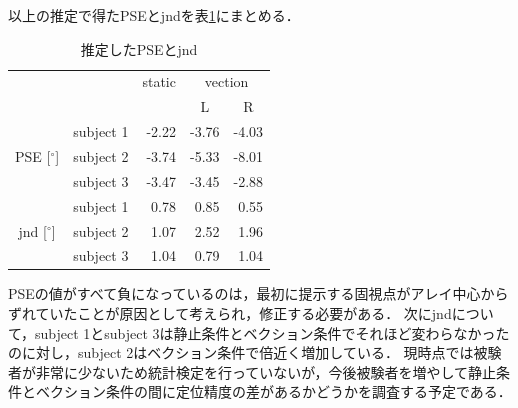 \documentclass[12pt,a4j]{jsarticle}
\renewcommand{\ }{\hspace{1zw}}
\begin{document}
\raggedright
以上の推定で得たPSEとjndを表\ref{table}にまとめる．
\begin{table}[htbp]
    \centering
    \caption{推定したPSEとjnd}
        \begin{tabular}{|c|c||r|r|r|}\hline
            \multicolumn{2}{|c||}{} & static & \multicolumn{2}{c|}{vection}\\
            \cline{4-5}
            \multicolumn{2}{|c||}{} &  & \multicolumn{1}{c|}{L} & \multicolumn{1}{c|}{R}\\ \hline \hline
             & subject 1 & -2.22 & -3.76 & -4.03 \\ \cline{2-5}
            PSE [$^\circ$] & subject 2 & -3.74 & -5.33 & -8.01\\ \cline{2-5}
             & subject 3 & -3.47 & -3.45 & -2.88 \\ \hline
             & subject 1 & 0.78 & 0.85 & 0.55 \\ \cline{2-5}
            jnd [$^\circ$] & subject 2 & 1.07 & 2.52 & 1.96 \\ \cline{2-5}
             & subject 3 & 1.04 & 0.79 & 1.04 \\ \hline
        \end{tabular}
    \label{table}
\end{table}

\raggedright
PSEの値がすべて負になっているのは，最初に提示する固視点がアレイ中心からずれていたことが原因として考えられ，修正する必要がある．
次にjndについて，subject 1とsubject 3は静止条件とベクション条件でそれほど変わらなかったのに対し，subject 2はベクション条件で倍近く増加している．
現時点では被験者が非常に少ないため統計検定を行っていないが，今後被験者を増やして静止条件とベクション条件の間に定位精度の差があるかどうかを調査する予定である．
\end{document}
